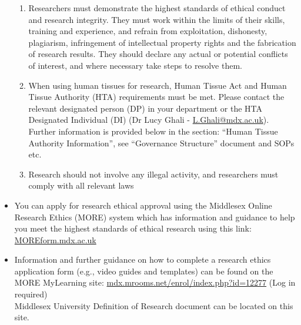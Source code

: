 \documentclass{MDXHandbook}
\begin{document}
\begin{itemize}
\begin{enumerate}
			\item Researchers must demonstrate the highest standards of ethical conduct and research integrity. They must work within the limits of their skills, training and experience, and refrain from exploitation, dishonesty, plagiarism, infringement of intellectual property rights and the fabrication of research results. They should declare any actual or potential conflicts of interest, and where necessary take steps to resolve them. 
			\item When using human tissues for research, Human Tissue Act and Human Tissue Authority (HTA) requirements must be met. Please contact the relevant designated person (DP) in your department or the HTA Designated Individual (DI) (Dr Lucy Ghali - \href{mailto:L.Ghali@mdx.ac.uk}{L.Ghali@mdx.ac.uk}). Further information is provided below in the section: ``Human Tissue Authority Information'', see ``Governance Structure'' document and SOPs etc.
			\item Research should not involve any illegal activity, and researchers must comply with all relevant laws
		\end{enumerate}
	\item You can apply for research ethical approval using the Middlesex Online Research Ethics (MORE) system which has information and guidance to help you meet the highest standards of ethical research using this link: \url{MOREform.mdx.ac.uk}
	\item Information and further guidance on how to complete a research ethics application form (e.g., video guides and templates) can be found on the MORE MyLearning site\textsuperscript{\ast}: \url{mdx.mrooms.net/enrol/index.php?id=12277} (Log in required)\\ 
 \textsuperscript{\ast}Middlesex University Definition of Research document can be located on this site.
\end{itemize}
\end{document}
